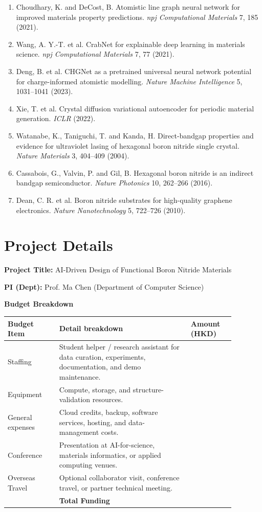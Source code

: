 \documentclass[10pt]{article}
\newcommand{\blank}[1][8em]{\colorbox{yellow!35}{\rule{0pt}{1.1em}\hspace{#1}}}
\begin{document}
\begin{enumerate}[leftmargin=1.2em,itemsep=1pt]
  \item Choudhary, K. and DeCost, B. Atomistic line graph neural network for improved materials property predictions. \textit{npj Computational Materials} 7, 185 (2021).
  \item Wang, A. Y.-T. et al. CrabNet for explainable deep learning in materials science. \textit{npj Computational Materials} 7, 77 (2021).
  \item Deng, B. et al. CHGNet as a pretrained universal neural network potential for charge-informed atomistic modelling. \textit{Nature Machine Intelligence} 5, 1031--1041 (2023).
  \item Xie, T. et al. Crystal diffusion variational autoencoder for periodic material generation. \textit{ICLR} (2022).
  \item Watanabe, K., Taniguchi, T. and Kanda, H. Direct-bandgap properties and evidence for ultraviolet lasing of hexagonal boron nitride single crystal. \textit{Nature Materials} 3, 404--409 (2004).
  \item Cassabois, G., Valvin, P. and Gil, B. Hexagonal boron nitride is an indirect bandgap semiconductor. \textit{Nature Photonics} 10, 262--266 (2016).
  \item Dean, C. R. et al. Boron nitride substrates for high-quality graphene electronics. \textit{Nature Nanotechnology} 5, 722--726 (2010).
\end{enumerate}
\normalsize

\section*{Project Details}
\textbf{Project Title:} AI-Driven Design of Functional Boron Nitride Materials

\textbf{PI (Dept):} Prof. Ma Chen (Department of Computer Science)

\textbf{Budget Breakdown}
\begin{center}
\small
\begin{tabular}{p{0.20\linewidth}p{0.51\linewidth}p{0.17\linewidth}}
\toprule
\textbf{Budget Item} & \textbf{Detail breakdown} & \textbf{Amount (HKD)} \\
\midrule
Staffing & Student helper / research assistant for data curation, experiments, documentation, and demo maintenance. & \blank \\
Equipment & Compute, storage, and structure-validation resources. & \blank \\
General expenses & Cloud credits, backup, software services, hosting, and data-management costs. & \blank \\
Conference & Presentation at AI-for-science, materials informatics, or applied computing venues. & \blank \\
Overseas Travel & Optional collaborator visit, conference travel, or partner technical meeting. & \blank \\
\midrule
 & \textbf{Total Funding} & \blank \\
\bottomrule
\end{tabular}
\end{center}
\end{document}
